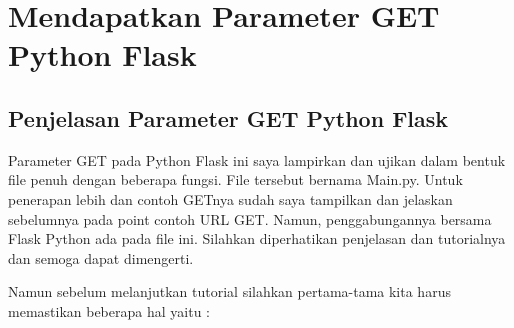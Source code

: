 \section {Mendapatkan Parameter GET Python Flask}
\subsection{Penjelasan Parameter GET Python Flask}
Parameter GET pada Python Flask ini saya lampirkan dan ujikan dalam bentuk file penuh dengan beberapa fungsi. File tersebut bernama Main.py. Untuk penerapan lebih dan contoh GETnya sudah saya tampilkan dan jelaskan sebelumnya pada point contoh URL GET. 
Namun, penggabungannya bersama Flask Python ada pada file ini. Silahkan diperhatikan penjelasan dan tutorialnya dan semoga dapat dimengerti. 

Namun sebelum melanjutkan tutorial silahkan pertama-tama kita harus memastikan beberapa hal yaitu :
